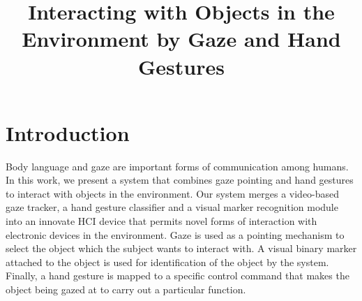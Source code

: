 \documentclass[jou,a4paper,notxfonts]{apa}
\title{Interacting with Objects in the Environment by Gaze and Hand Gestures}
\begin{document}
\maketitle

\thispagestyle{plain}


\section{Introduction} 
Body language and gaze are important forms of communication among humans. In this work, we present a system that
combines gaze pointing and hand gestures to interact with objects in the environment. Our system merges a video-based gaze
tracker, a hand gesture classifier and a visual marker recognition module into an innovate HCI device that permits novel
forms of interaction with electronic devices in the environment. Gaze is used as a pointing mechanism to select the
object which the subject wants to interact with. A visual binary marker attached to the object is used for
identification of the object by the system. Finally, a hand gesture is mapped to a specific control command that makes
the object being gazed at to carry out a particular function.
\end{document}

